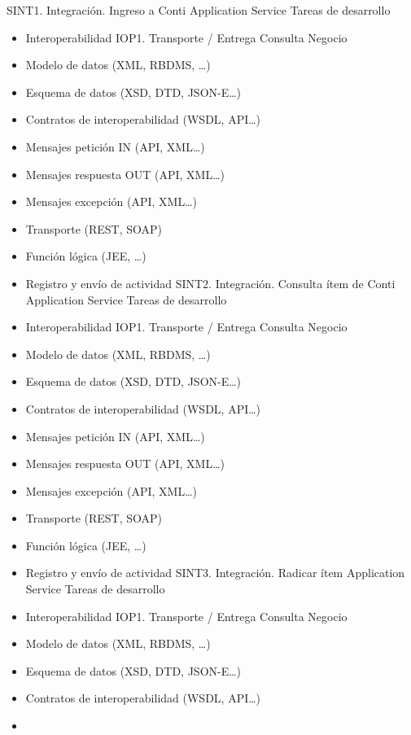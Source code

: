 \documentclass[
  paper=a4,
  ,captions=tableheading
]{scrartcl}
\begin{document}
\textbar{} \textbar{} SINT1. Integración. Ingreso a Conti \textbar{}
Application Service \textbar{} Tareas de desarrollo

\begin{itemize}
\item
  Interoperabilidad IOP1. Transporte / Entrega Consulta Negocio
\item
  Modelo de datos (XML, RBDMS, \ldots)
\item
  Esquema de datos (XSD, DTD, JSON-E\ldots)
\item
  Contratos de interoperabilidad (WSDL, API\ldots)
\item
  Mensajes petición IN (API, XML\ldots)
\item
  Mensajes respuesta OUT (API, XML\ldots)
\item
  Mensajes excepción (API, XML\ldots)
\item
  Transporte (REST, SOAP)
\item
  Función lógica (JEE, \ldots)
\item
  Registro y envío de actividad \textbar{} \textbar{} SINT2.
  Integración. Consulta ítem de Conti \textbar{} Application Service
  \textbar{} Tareas de desarrollo
\item
  Interoperabilidad IOP1. Transporte / Entrega Consulta Negocio
\item
  Modelo de datos (XML, RBDMS, \ldots)
\item
  Esquema de datos (XSD, DTD, JSON-E\ldots)
\item
  Contratos de interoperabilidad (WSDL, API\ldots)
\item
  Mensajes petición IN (API, XML\ldots)
\item
  Mensajes respuesta OUT (API, XML\ldots)
\item
  Mensajes excepción (API, XML\ldots)
\item
  Transporte (REST, SOAP)
\item
  Función lógica (JEE, \ldots)
\item
  Registro y envío de actividad \textbar{} \textbar{} SINT3.
  Integración. Radicar ítem \textbar{} Application Service \textbar{}
  Tareas de desarrollo
\item
  Interoperabilidad IOP1. Transporte / Entrega Consulta Negocio
\item
  Modelo de datos (XML, RBDMS, \ldots)
\item
  Esquema de datos (XSD, DTD, JSON-E\ldots)
\item
  Contratos de interoperabilidad (WSDL, API\ldots)
\item

\end{itemize}
\end{document}
